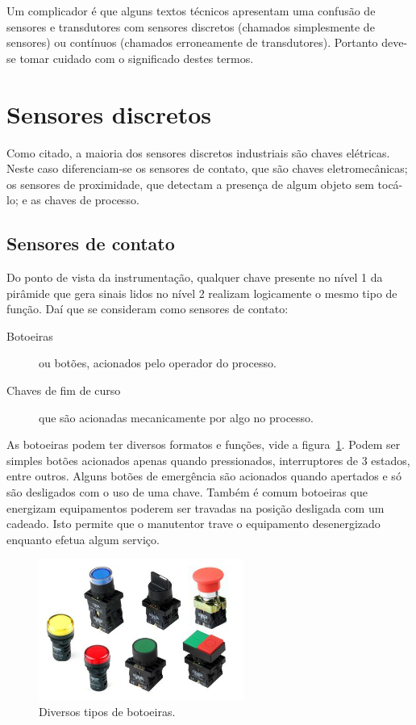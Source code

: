 Um complicador é que alguns textos técnicos apresentam uma confusão de sensores e transdutores com sensores discretos (chamados simplesmente de sensores) ou contínuos (chamados erroneamente de transdutores). Portanto deve-se tomar cuidado com o significado destes termos.

\section{Sensores discretos}

Como citado, a maioria dos sensores discretos industriais são chaves elétricas. Neste caso diferenciam-se os sensores de contato, que são chaves eletromecânicas; os sensores de proximidade, que detectam a presença de algum objeto sem tocá-lo; e as chaves de processo.

\subsection{Sensores de contato}
Do ponto de vista da instrumentação, qualquer chave presente no nível 1 da pirâmide que gera sinais lidos no nível 2 realizam logicamente o mesmo tipo de função. Daí que se consideram como sensores de contato:
\begin{description}
  \item[Botoeiras] ou botões, acionados pelo operador do processo.
  \item[Chaves de fim de curso] que são acionadas mecanicamente por algo no processo.
\end{description}

As botoeiras podem ter diversos formatos e funções, vide a figura~\ref{fig:botoeiras}. Podem ser simples botões acionados apenas quando pressionados, interruptores de 3 estados, entre outros. Alguns botões de emergência são acionados quando apertados e só são desligados com o uso de uma chave. Também é comum botoeiras que energizam equipamentos poderem ser travadas na posição desligada com um cadeado. Isto permite que o manutentor trave o equipamento desenergizado enquanto efetua algum serviço.

\begin{figure}
  \centering
  \includegraphics[width=0.6\textwidth]{figuras/botoeiras}
  \caption{Diversos tipos de botoeiras.}\label{fig:botoeiras}
\end{figure}

